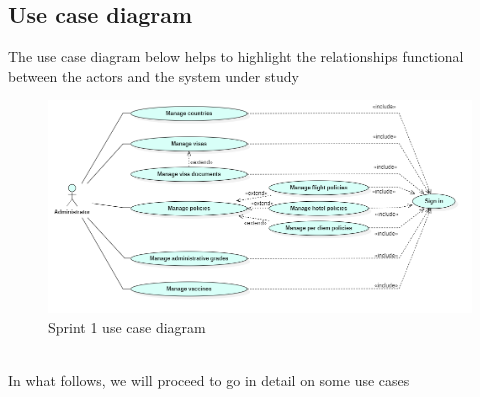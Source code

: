     \subsection{Use case diagram}
    The use case diagram below helps to highlight the relationships
functional between the actors and the system under study 
    \begin{figure}[H]
    \begin{center}
        \includegraphics[scale=0.50]{img/UseCaseDiagramSprint1.png}
        \caption{Sprint 1 use case diagram}
    \end{center}
        \label{fig:my_label}
\end{figure}
  \\ In what follows, we will proceed to go in detail on some use cases  


